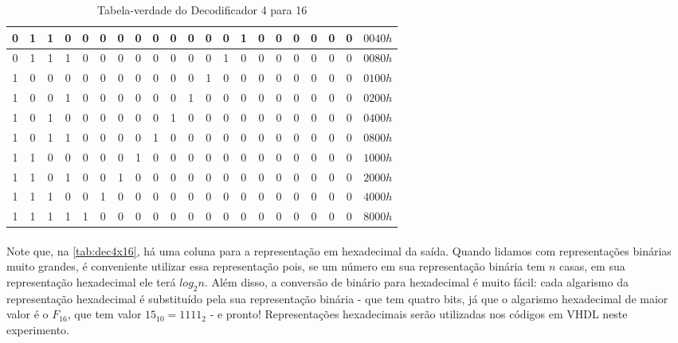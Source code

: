 \documentclass[a4paper,12pt]{article}
\begin{document}
\begin{table}[H]
\begin{tabular}{|cccc|cccccccccccccccc|c|}
        0 & 1 & 1 & 0 & 0 & 0 & 0 & 0 & 0 & 0 & 0 & 0 & 0 & 1 & 0 & 0 & 0 & 0 & 0 & 0 & $0040h$ \\ \hline
        \rowcolor{cinza}
        0 & 1 & 1 & 1 & 0 & 0 & 0 & 0 & 0 & 0 & 0 & 0 & 1 & 0 & 0 & 0 & 0 & 0 & 0 & 0 & $0080h$ \\ \hline
        1 & 0 & 0 & 0 & 0 & 0 & 0 & 0 & 0 & 0 & 0 & 1 & 0 & 0 & 0 & 0 & 0 & 0 & 0 & 0 & $0100h$ \\ \hline
        \rowcolor{cinza}
        1 & 0 & 0 & 1 & 0 & 0 & 0 & 0 & 0 & 0 & 1 & 0 & 0 & 0 & 0 & 0 & 0 & 0 & 0 & 0 & $0200h$ \\ \hline
        1 & 0 & 1 & 0 & 0 & 0 & 0 & 0 & 0 & 1 & 0 & 0 & 0 & 0 & 0 & 0 & 0 & 0 & 0 & 0 & $0400h$ \\ \hline
        \rowcolor{cinza}
        1 & 0 & 1 & 1 & 0 & 0 & 0 & 0 & 1 & 0 & 0 & 0 & 0 & 0 & 0 & 0 & 0 & 0 & 0 & 0 & $0800h$ \\ \hline
        1 & 1 & 0 & 0 & 0 & 0 & 0 & 1 & 0 & 0 & 0 & 0 & 0 & 0 & 0 & 0 & 0 & 0 & 0 & 0 & $1000h$ \\ \hline
        \rowcolor{cinza}
        1 & 1 & 0 & 1 & 0 & 0 & 1 & 0 & 0 & 0 & 0 & 0 & 0 & 0 & 0 & 0 & 0 & 0 & 0 & 0 & $2000h$ \\ \hline
        1 & 1 & 1 & 0 & 0 & 1 & 0 & 0 & 0 & 0 & 0 & 0 & 0 & 0 & 0 & 0 & 0 & 0 & 0 & 0 & $4000h$ \\ \hline
        \rowcolor{cinza}
        1 & 1 & 1 & 1 & 1 & 0 & 0 & 0 & 0 & 0 & 0 & 0 & 0 & 0 & 0 & 0 & 0 & 0 & 0 & 0 & $8000h$ \\ \hline
    \end{tabular}
    \caption{Tabela-verdade do Decodificador 4 para 16} \label{tab:dec4x16}
    \label{tab:dec4x16}
    \vspace{-20pt}
\end{table}

\paragraph{}
Note que, na \autoref{tab:dec4x16}, há uma coluna para a representação em hexadecimal da saída. Quando lidamos com representações binárias muito grandes, é conveniente utilizar essa representação pois, se um número em sua representação binária tem $n$ casas, em sua representação hexadecimal ele terá $log_2 n$. Além disso, a conversão de binário para hexadecimal é muito fácil: cada algarismo da representação hexadecimal é substituído pela sua representação binária - que tem quatro bits, já que o algarismo hexadecimal de maior valor é o $F_{16}$, que tem valor $15_{10} = 1111_{2}$ - e pronto! Representações hexadecimais serão utilizadas nos códigos em VHDL neste experimento.
\end{document}
